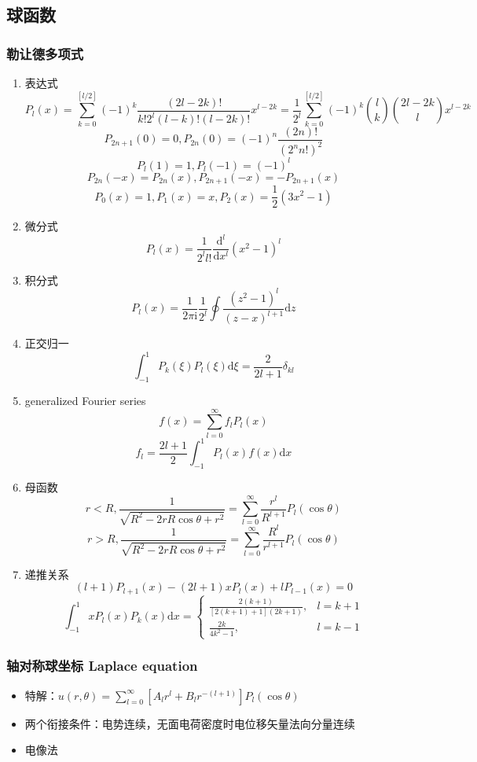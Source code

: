 \documentclass{article}
\begin{document}
\subsection{球函数}

\subsubsection{勒让德多项式}

\begin{enumerate}
    \item 表达式 $$P_l(x)=\sum^{[l/2]}_{k=0}(-1)^k\frac{(2l-2k)!}{k!2^l(l-k)!(l-2k)!}x^{l-2k}={\frac {1}{2^{l}}}\sum _{k=0}^{[l/2]}(-1)^{k}{\binom {l}{k}}{\binom {2l-2k}{l}}x^{l-2k}$$ $$P_{2n+1}(0)=0, P_{2n}(0)=(-1)^n\frac{(2n)!}{(2^nn!)^2}$$ $$P_l(1)=1, P_l(-1)=(-1)^l$$ $$P_{2n}(-x)=P_{2n}(x), P_{2n+1}(-x)=-P_{2n+1}(x)$$ $$P_0(x)=1, P_1(x)=x, P_2(x)=\frac{1}{2}(3x^2-1)$$
    \item 微分式 $$P_l(x)=\frac{1}{2^ll!}\frac{\mathrm{d}^l}{\mathrm{d}x^l}(x^2-1)^l$$
    \item 积分式 $$P_l(x)=\frac{1}{2\pi\mathrm{i}}\frac{1}{2^l}\oint\frac{(z^2-1)^l}{(z-x)^{l+1}}\mathrm{d}z$$
    \item 正交归一 $$\int^1_{-1}P_k(\xi)P_l(\xi)\mathrm{d}\xi=\frac{2}{2l+1}\delta_{kl}$$
    \item generalized Fourier series $$f(x)=\sum^\infty_{l=0}f_lP_l(x)$$ $$f_l=\frac{2l+1}{2}\int^1_{-1}P_l(x)f(x)\mathrm{d}x$$
    \item 母函数 $$r<R,\frac{1}{\sqrt{R^2-2rR\cos\theta+r^2}}=\sum^\infty_{l=0}\frac{r^l}{R^{l+1}}P_l(\cos\theta)$$ $$r>R,\frac{1}{\sqrt{R^2-2rR\cos\theta+r^2}}=\sum^\infty_{l=0}\frac{R^l}{r^{l+1}}P_l(\cos\theta)$$
    \item 递推关系 $$(l+1)P_{l+1}(x)-(2l+1)xP_l(x)+lP_{l-1}(x)=0$$ $$\int^1_{-1}xP_l(x)P_k(x)\mathrm{d}x=
    \begin{cases}
        \frac{2(k+1)}{[2(k+1)+1](2k+1)},& l=k+1\\
        \frac{2k}{4k^2-1},& l=k-1
    \end{cases}$$
\end{enumerate}

\subsubsection{轴对称球坐标 Laplace equation}

\begin{itemize}
    \item 特解：$u(r, \theta)=\sum^\infty_{l=0}[A_lr^l+B_lr^{-(l+1)}]P_l(\cos\theta)$
    \item 两个衔接条件：电势连续，无面电荷密度时电位移矢量法向分量连续
    \item 电像法
\end{itemize}
\end{document}
